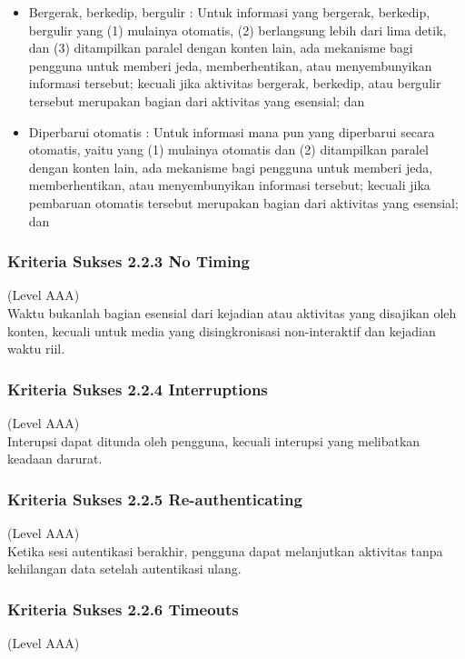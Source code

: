 \documentclass[a4paper,twoside]{article}
\begin{document}
\begin{enumerate}
		\begin{itemize}
			\item Bergerak, berkedip, bergulir : Untuk informasi yang bergerak, berkedip, bergulir yang (1) mulainya otomatis, (2) berlangsung lebih dari lima detik, dan (3) ditampilkan paralel dengan konten lain, ada mekanisme bagi pengguna untuk memberi jeda, memberhentikan, atau menyembunyikan informasi tersebut; kecuali jika aktivitas bergerak, berkedip, atau bergulir tersebut merupakan bagian dari aktivitas yang esensial; dan
			\item Diperbarui otomatis : Untuk informasi mana pun yang diperbarui secara otomatis, yaitu yang (1) mulainya otomatis dan (2) ditampilkan paralel dengan konten lain, ada mekanisme bagi pengguna untuk memberi jeda, memberhentikan, atau menyembunyikan informasi tersebut; kecuali jika pembaruan otomatis tersebut merupakan bagian dari aktivitas yang esensial; dan
		\end{itemize}
		
		\subsubsection*{Kriteria Sukses 2.2.3 No Timing}
		\label{subsubsec:kriteria_2.2.3}
		(Level AAA) \\
		
		Waktu bukanlah bagian esensial dari kejadian atau aktivitas yang disajikan oleh konten, kecuali untuk media yang disingkronisasi non-interaktif dan kejadian waktu riil.
		
		\subsubsection*{Kriteria Sukses 2.2.4 Interruptions}
		\label{subsubsec:kriteria_2.2.4}
		(Level AAA) \\
		
		Interupsi dapat ditunda oleh pengguna, kecuali interupsi yang melibatkan keadaan darurat.
		
		\subsubsection*{Kriteria Sukses 2.2.5 Re-authenticating}
		\label{subsubsec:kriteria_2.2.5}
		(Level AAA) \\
		
		Ketika sesi autentikasi berakhir, pengguna dapat melanjutkan aktivitas tanpa kehilangan data setelah autentikasi ulang.
		
		\subsubsection*{Kriteria Sukses 2.2.6 Timeouts}
		\label{subsubsec:kriteria_2.2.6}
		(Level AAA) \\
		

\end{enumerate}
\end{document}
